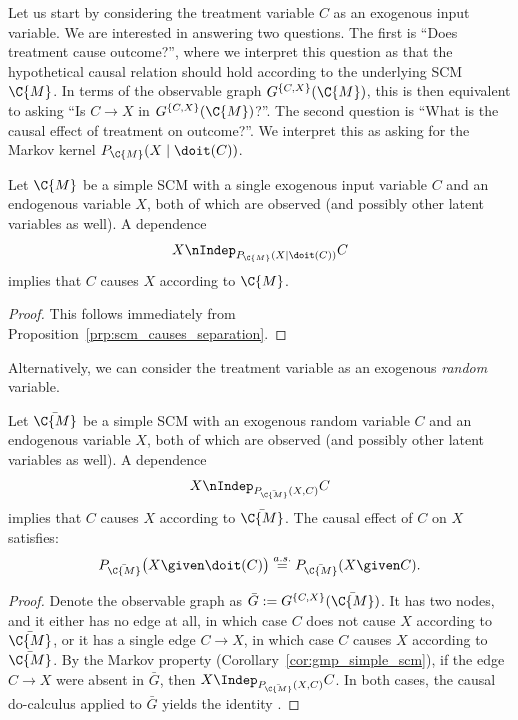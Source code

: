 Let us start by considering the treatment variable $C$ as an exogenous input variable. 
We are interested in answering two questions. The first is
``Does treatment cause outcome?'', where we interpret this question as that the 
hypothetical causal relation should hold according to the underlying SCM $\C{M}$. 
In terms of the observable graph $G^{\{C,X\}}(\C{M})$,
this is then equivalent to asking ``Is $C \to X$ in $G^{\{C,X\}}(\C{M})$?''.
The second question is ``What is the causal effect of treatment on outcome?''.
We interpret this as asking for the Markov kernel $P_{\C{M}}(X \mid \doit(C))$.
\begin{Prp}\label{prp:RCT1}
Let $\C{M}$ be a simple SCM with a single exogenous input variable $C$ and an 
endogenous variable $X$, both of which are observed (and possibly other latent variables as well).
A dependence 
  \begin{equation}\label{eq:RCT_CI_statement1}
    X \nIndep_{P_{\C{M}}(X\mid\doit(C))} C 
  \end{equation}
implies that $C$ causes $X$ according to $\C{M}$. 
\end{Prp}
\begin{proof}
This follows immediately from Proposition~\ref{prp:scm_causes_separation}.
\end{proof}

Alternatively, we can consider the treatment variable as an exogenous \emph{random} variable.
\begin{Prp}\label{prp:RCT2}
Let $\bar{\C{M}}$ be a simple SCM with an exogenous random variable $C$ and an endogenous 
variable $X$, both of which are observed (and possibly other latent variables as well).
A dependence 
  \begin{equation}\label{eq:RCT_CI_statement2}
    X \nIndep_{P_{\bar{\C{M}}}(X,C)} C 
  \end{equation}
implies that $C$ causes $X$ according to $\bar{\C{M}}$.
The causal effect of $C$ on $X$ satisfies:
  \begin{equation}\label{eq:RCT_causal_effect2}
    P_{\bar{\C{M}}}\big(X \given \doit(C)\big) \stackrel{a.s.}{=} P_{\bar{\C{M}}}(X \given C).
  \end{equation}
\end{Prp}
\begin{proof}
Denote the observable graph as $\bar{G} := G^{\{C,X\}}(\bar{\C{M}})$.
It has two nodes, and it either has no edge at all, in which case $C$ does not cause $X$ according to
$\bar{\C{M}}$, or it has a single edge $C \to X$, in which case $C$ causes $X$ according to $\bar{\C{M}}$.
By the Markov property (Corollary~\ref{cor:gmp_simple_scm}), if the edge $C \to X$ were absent in $\bar{G}$, 
then $X \Indep_{P_{\bar{\C{M}}}(X,C)} C$. 
In both cases, the causal do-calculus applied to $\bar{G}$ yields the identity . 
\end{proof}

